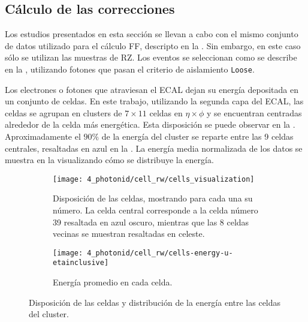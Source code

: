 \subsection{Cálculo de las correcciones}
\label{subsec:ss_corrections:cell_rw:calculation}


Los estudios presentados en esta sección se llevan a cabo con el mismo conjunto de datos utilizado para el cálculo \ac{FF}, descripto en la \Sect{\ref{subsec:ss_corrections:ffs:samples}}. Sin embargo, en este caso sólo se utilizan las muestras de \ac{RZ}.
Los eventos se seleccionan como se describe en la \Sect{\ref{subsec:pid_ss:pid:event_selection}}, utilizando fotones que pasan el criterio de aislamiento \texttt{Loose}.

Los electrones o fotones que atraviesan el \ac{ECAL} dejan su energía depositada en un conjunto de celdas. En este trabajo, utilizando la segunda capa del \ac{ECAL}, las celdas se agrupan en clusters de \(7\times 11\) celdas en \(\eta\times\phi\) y se encuentran centradas alrededor de la celda más energética. Esta disposición se puede observar en la \Fig{\ref{fig:ss_corrections:cell_rw:event_selection:cluster:arrangement}}. Aproximadamente el \(90\%\) de la energía del cluster se reparte entre las 9 celdas centrales, resaltadas en azul en la \Fig{\ref{fig:ss_corrections:cell_rw:event_selection:cluster:arrangement}}. La energía media normalizada de los datos se muestra en la \Fig{\ref{fig:ss_corrections:cell_rw:event_selection:cluster:energy}} visualizando cómo se distribuye la energía.

\begin{figure}[ht!]
    \centering
    \begin{subfigure}[t]{0.49\linewidth}
        \centering
        \texttt{[image: 4\_photonid/cell\_rw/cells\_visualization]}
        \caption{Disposición de las celdas, mostrando para cada una su número. La celda central corresponde a la celda número 39 resaltada en azul oscuro, mientras que las 8 celdas vecinas se muestran resaltadas en celeste.}
        \label{fig:ss_corrections:cell_rw:event_selection:cluster:arrangement}
    \end{subfigure}
    \hfill
    \begin{subfigure}[t]{0.49\linewidth}
        \centering
        \texttt{[image: 4\_photonid/cell\_rw/cells-energy-u-etainclusive]}
        \caption{Energía promedio en cada celda.}
        \label{fig:ss_corrections:cell_rw:event_selection:cluster:energy}
    \end{subfigure}
    \caption{Disposición de las celdas y distribución de la energía entre las celdas del cluster.}
    \label{fig:ss_corrections:cell_rw:event_selection:cluster}
\end{figure}


